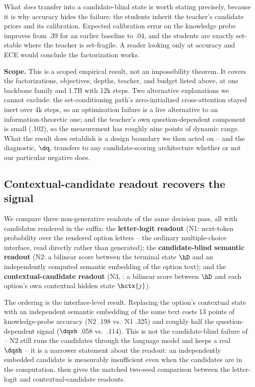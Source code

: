 What \emph{does} transfer into a candidate-blind state is worth stating precisely, because it is why
accuracy hides the failure: the students inherit the teacher's candidate priors and its calibration.
Expected calibration error on the knowledge probe improves from .39 for an earlier baseline to .04, and
the students are exactly set-stable where the teacher is set-fragile. A reader looking only at accuracy
and ECE would conclude the factorization works.

\textbf{Scope.} This is a scoped empirical result, not an impossibility theorem. It covers the
factorizations, objectives, depths, teacher, and budget listed above, at one backbone family and 1.7B
with 12k steps. Two alternative explanations we cannot exclude: the set-conditioning path's
zero-initialized cross-attention stayed inert over 4k steps, so an optimization failure is a live
alternative to an information-theoretic one; and the teacher's own question-dependent component is
small (.102), so the measurement has roughly nine points of dynamic range. What the result does
establish is a design boundary we then acted on -- and the diagnostic, $\dq$, transfers to any
candidate-scoring architecture whether or not our particular negative does.

\subsection{Contextual-candidate readout recovers the signal}
\label{sec:repr:readout}

We compare three non-generative readouts of the same decision pass, all with candidates rendered in the
suffix: the \textbf{letter-logit readout} (N1: next-token probability over the rendered option letters
-- the ordinary multiple-choice interface, read directly rather than generated); the
\textbf{candidate-blind semantic readout} (N2: a bilinear score between the terminal state $\hD$ and an
independently computed semantic embedding of the option text); and the \textbf{contextual-candidate
readout} (N3, : a bilinear score between $\hD$ and each option's own contextual
hidden state $\hctx{j}$).

The ordering is the interface-level result. Replacing the option's contextual state with an independent
semantic embedding of the same text costs 13 points of knowledge-probe accuracy (N2 .198 vs.\ N1 .325)
and roughly half the question-dependent signal ($\dqsh$ .058 vs.\ .114). This is not the candidate-blind
failure of  -- N2 still runs the candidates through the language model and keeps a
real $\dqsh$ -- it is a narrower statement about the readout: an independently embedded candidate is
measurably insufficient even when the candidates are in the computation.  then gives the
matched two-seed comparison between the letter-logit and contextual-candidate readouts.

